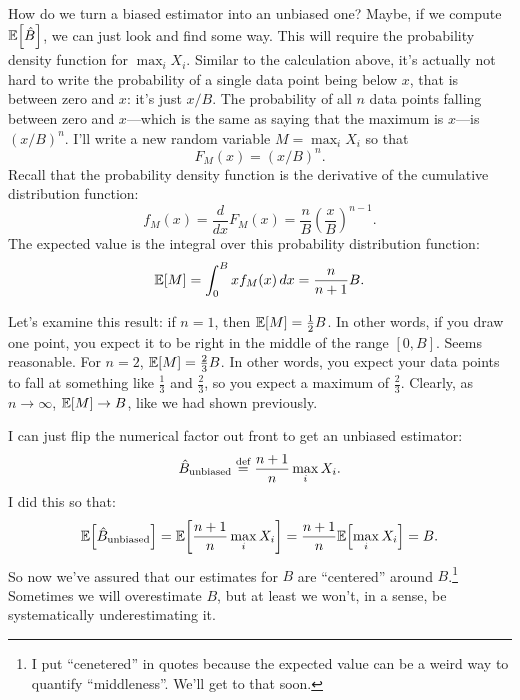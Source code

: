 How do we turn a biased estimator into an unbiased one? Maybe, if we compute
$\mathbb{E}\!\left[{\hat{B}}\right]$, we can just look and find some way. This will require the
probability density function for $\max_i X_i$. Similar to the calculation above,
it's actually not hard to write the probability of a single data point being
below $x$, that is between zero and $x$: it's just $x/B$. The probability of all
$n$ data points falling between zero and $x$---which is the same as saying that
the maximum is $x$---is $(x/B)^n$. I'll write a new random variable $M = \max_i X_i$
so that
\begin{equation}
F_M(x) = (x/B)^n.
\end{equation}
Recall that the probability density function is the derivative of the cumulative
distribution function:
\begin{equation}
f_M(x) = \frac{d}{dx} F_M(x) = \frac{n}{B} \left( \frac{x}{B} \right)^{n-1}.
\end{equation}
The expected value is the integral over this probability distribution function:
\begin{equation}
\mathbb{E}\!\left[{M}\right] = \int_0^B x f_M(x) \,dx = \frac{n}{n+1} B.
\end{equation}

Let's examine this result: if $n=1$, then $\mathbb{E}\!\left[{M}\right] = \tfrac{1}{2}B$. In
other words, if you draw one point, you expect it to be right in the middle of
the range $[0, B]$. Seems reasonable. For $n=2$, $\mathbb{E}\!\left[{M}\right] = \tfrac{2}{3}B$.
In other words, you expect your data points to fall at something like
$\tfrac{1}{3}$ and $\tfrac{2}{3}$, so you expect a maximum of $\tfrac{2}{3}$.
Clearly, as $n \to \infty$, $\mathbb{E}\!\left[{M}\right] \to B$, like we had shown previously.

I can just flip the numerical factor out front to get
an unbiased estimator:
\begin{equation}
\hat{B}_\mathrm{unbiased} \stackrel{\text{def}}{=} \frac{n+1}{n} \max_i X_i.
\end{equation}
I did this so that:
\begin{equation}
\mathbb{E}\!\left[{\hat{B}_\text{unbiased}}\right] = \mathbb{E}\!\left[{\frac{n+1}{n} \max_i X_i}\right] = \frac{n+1}{n} \mathbb{E}\!\left[{\max_i X_i}\right] = B.
\end{equation}
So now we've assured that our estimates for $B$ are ``centered'' around
$B$.\footnote{I put ``cenetered'' in quotes because the expected value can be
a weird way to quantify ``middleness''. We'll get to that soon.} Sometimes we
will overestimate $B$, but at least we won't, in a sense, be systematically
underestimating it.

